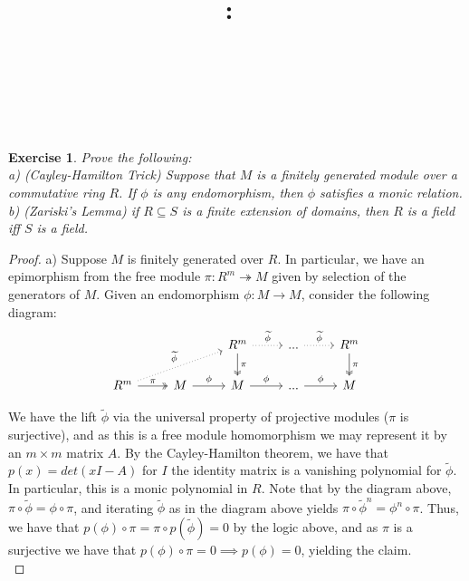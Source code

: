 \documentclass{article}
\title{
    \vspace{2in}
    \textmd{\textbf{\hmwkClass:\ \hmwkTitle}}\\
    \vspace{0.1in}
    \textmd{\hmwkDueDate} \\
    \vspace{0.2in}\large{\textit{\hmwkClassInstructor\  }}
    \vspace{2in}
}
\author{\hmwkAuthorName}
\date{}
\newtheorem{exercise}{Exercise}
\begin{document}
\maketitle

\newpage
\begin{exercise}
  Prove the following: \\
  a) (Cayley-Hamilton Trick) Suppose that $M$ is a finitely generated module over a commutative ring $R$. If $\phi$ is any endomorphism, then $\phi$ satisfies a monic relation. \\
  b) (Zariski's Lemma) if $R \subseteq S$ is a finite extension of domains, then $R$ is a field iff $S$ is a field.
\end{exercise}
\begin{proof}
  a) Suppose $M$ is finitely generated over $R$. In particular, we have an epimorphism from the free module $\pi: R^{m} \twoheadrightarrow M$ given by selection of the generators of $M$. Given an endomorphism $\phi: M \to M$, consider the following diagram:\\
\[  
\begin{tikzcd}
                                                                        &                     & R^m \arrow[d, "\pi", two heads] \arrow[r, "\widetilde{\phi}", dotted] & ... \arrow[r, "\widetilde{\phi}", dotted] & R^m \arrow[d, "\pi", two heads] \\
R^m \arrow[r, "\pi", two heads] \arrow[rru, "\widetilde{\phi}", dotted] & M \arrow[r, "\phi"] & M \arrow[r, "\phi"]                                                   & ... \arrow[r, "\phi"]                     & M                              
\end{tikzcd}
\]

We have the lift $\widetilde{\phi}$ via the universal property of projective modules ($\pi$ is surjective), and as this is a free module homomorphism we may represent it by an $m \times m$ matrix $A$. By the Cayley-Hamilton theorem, we have that $p(x) = det(xI - A)$ for $I$ the identity matrix is a vanishing polynomial for $\widetilde{\phi}$. In particular, this is a monic polynomial in $R$. Note that by the diagram above, $\pi \circ \widetilde\phi = \phi \circ \pi$, and iterating $\widetilde\phi$ as in the diagram above yields $\pi \circ \widetilde\phi^{n} = \phi^{n} \circ \pi$. Thus, we have that $p(\phi) \circ \pi = \pi \circ p(\widetilde\phi) = 0$ by the logic above, and as $\pi$ is a surjective we have that $p(\phi) \circ \pi = 0 \implies p(\phi) = 0$, yielding the claim. \\


\end{proof}
\end{document}
